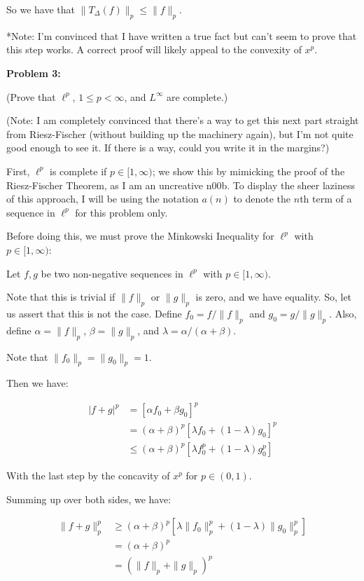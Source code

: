 \documentclass[a4paper,12pt]{article}
\newcommand{\tab}{\hspace{4mm}} %
\newcommand{\shunt}{\vspace{20mm}}
\newcommand{\absval}[1]{\left\lvert #1 \right\rvert}
\newcommand{\norm}[1]{\|#1\|}
\newcommand{\al}{\alpha} %
\newcommand{\be}{\beta}
\newcommand{\De}{\Delta}
\newcommand{\la}{\lambda}
\begin{document}
So we have that $\norm{T_\De(f)}_p \leq \norm{f}_p$. 

*Note: I'm convinced that I have written a true fact but can't seem to prove that this step works. A correct proof will likely appeal to the convexity of $x^p$.

\shunt

{\bf Problem 3:} 

(Prove that $\ell^p$, $1\leq p < \infty$, and $L^\infty$ are complete.)

(Note: I am completely convinced that there's a way to get this next part straight from Riesz-Fischer (without building up the machinery again), but I'm not quite good enough to see it. If there is a way, could you write it in the margins?)

First, $\ell^p$ is complete if $p \in [1, \infty)$; we show this by mimicking the proof of the Riesz-Fischer Theorem, as I am an uncreative n00b. To display the sheer laziness of this approach, I will be using the notation $a(n)$ to denote the $n$th term of a sequence in $\ell^p$ for this problem only.

Before doing this, we must prove the Minkowski Inequality for $\ell^p$ with $p \in [1,\infty)$:

\tab Let $f,g$ be two non-negative sequences in $\ell^p$ with $p \in [1,\infty)$.

\tab Note that this is trivial if $\norm{f}_p$ or $\norm{g}_p$ is zero, and we have equality. So, let us assert that this is not the case. Define $f_0=f/\norm{f}_p$ and $g_0=g/\norm{g}_p$. Also, define $\al = \norm{f}_p$, $\be=\norm{g}_p$, and $\la = \al/(\al+\be)$.

\tab Note that $\norm{f_0}_p=\norm{g_0}_p=1$.

\tab Then we have:

\begin{align*}
\absval{f+g}^p &= [\al f_0 + \be g_0]^p\\
&= (\al+\be)^p[\la f_0 + (1-\la) g_0]^p\\
&\leq (\al+\be)^p[\la f_0^p + (1-\la) g_0^p]
\end{align*}

\tab With the last step by the concavity of $x^p$ for $p \in (0,1)$.

\tab Summing up over both sides, we have:

\begin{align*}
\norm{f+g}_p^p &\geq (\al+\be)^p[\la \norm{f_0}_p^p+(1-\la)\norm{g_0}_p^p]\\
&=(\al+\be)^p\\
&=(\norm{f}_p+\norm{g}_p)^p
\end{align*}
\end{document}
